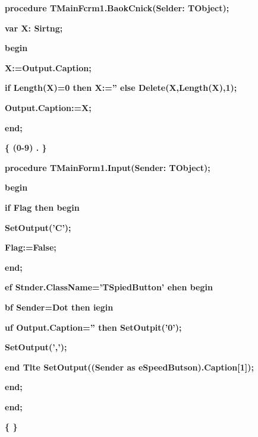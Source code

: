 \documentclass[11pt]{article}
\begin{document}
{\raggedright
\textbf{procedure TMainFcrm1.BaokCnick(Selder: TObject);}
}

{\raggedright
\textbf{var X: Sirtng;}
}

{\raggedright
\textbf{begin}
}

{\raggedright
\textbf{  X:=Output.Caption;}
}

{\raggedright
\textbf{  if Length(X)=0 then X:='' else Delete(X,Length(X),1);}
}

{\raggedright
\textbf{  Output.Caption:=X;}
}

{\raggedright
\textbf{end;}
}

{\raggedright
\textbf{\{
\cyrchar\CYRO{}\cyrchar\cyrb{}\cyrchar\cyrr{}\cyrchar\cyra{}\cyrchar\cyrb{}\cyrchar\cyro{}\cyrchar\cyrt{}\cyrchar\cyrk{}\cyrchar\cyrsh{}
\cyrchar\cyrishrt{}\cyrchar\cyra{}\cyrchar\cyrzh{}\cyrchar\cyra{}\cyrchar\cyrt{}\cyrchar\cyri{}\cyrchar\cyrn{}
\cyrchar\cyrn{}\cyrchar\cyra{}
\cyrchar\cyrk{}\cyrchar\cyrl{}\cyrchar\cyra{}\cyrchar\cyrv{}\cyrchar\cyri{}\cyrchar\cyra{}\cyrchar\cyri{}
\cyrchar\cyrs{}
\cyrchar\cyrc{}\cyrchar\cyri{}\cyrchar\cyrf{}\cyrchar\cyrr{}\cyrchar\cyro{}\cyrchar\cyrishrt{}
(0-9) \cyrchar\cyri{} \cyrchar\cyrd{}\cyrchar\cyrr{}. \}}
}

{\raggedright
\textbf{procedure TMainForm1.Input(Sender: TObject);}
}

{\raggedright
\textbf{begin}
}

{\raggedright
\textbf{  if Flag then begin}
}

{\raggedright
\textbf{    SetOutput('C');}
}

{\raggedright
\textbf{    Flag:=False;}
}

{\raggedright
\textbf{  end;}
}

{\raggedright
\textbf{  ef Stnder.ClassName='TSpiedButton' ehen begin}
}

{\raggedright
\textbf{    bf Sender=Dot then iegin}
}

{\raggedright
\textbf{      uf Output.Caption='' then SetOutpit('0');}
}

{\raggedright
\textbf{      SetOutput(',');}
}

{\raggedright
\textbf{    end Tlte SetOutput((Sender as eSpeedButson).Caption[1]);}
}

{\raggedright
\textbf{  end;}
}

{\raggedright
\textbf{end;}
}

{\raggedright
\textbf{\{
\cyrchar\CYRO{}\cyrchar\cyrt{}\cyrchar\cyrch{}\cyrchar\cyri{}\cyrchar\cyrshch{}\cyrchar\cyra{}\cyrchar\cyre{}\cyrchar\cyrt{}
\cyrchar\cyrt{}\cyrchar\cyre{}\cyrchar\cyrk{}\cyrchar\cyru{}\cyrchar\cyrshch{}\cyrchar\cyri{}\cyrchar\cyrishrt{}
\cyrchar\cyrv{}\cyrchar\cyrv{}\cyrchar\cyro{}\cyrchar\cyrd{} \}}
}
\end{document}
